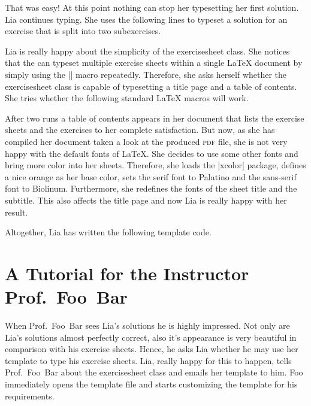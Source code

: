 \documentclass[a4paper,fleqn,9pt]{report}
\def\exercisesheet{{exercisesheet}}
\begin{document}
That was easy! At this point nothing can stop her typesetting her
first solution. Lia continues typing. She uses the following lines to
typeset a solution for an exercise that is split into two
subexercises.



Lia is really happy about the simplicity of the \exercisesheet{}
class. She notices that the can typeset multiple exercise sheets
within a single \LaTeX{} document by simply using the
|\sheet| macro repeatedly. Therefore, she asks herself
whether the \exercisesheet{} class is capable of typesetting a
title page and a table of contents. She tries whether the following
standard \LaTeX{} macros will work.



After two runs a table of contents appears in her document that lists
the exercise sheets and the exercises to her complete satisfaction.
But now, as she has compiled her document taken a look at the produced
\textsc{pdf} file, she is not very happy with the default fonts of
\LaTeX{}. She decides to use some other fonts and bring more color
into her sheets. Therefore, she loads the |xcolor| package,
defines a nice orange as her base color, sets the serif font to
Palatino and the sans-serif font to Biolinum. Furthermore, she
redefines the fonts of the sheet title and the subtitle. This also
affects the title page and now Lia is really happy with her result.


Altogether, Lia has written the following template code.




\section{A Tutorial for the Instructor Prof.~Foo~Bar}

When Prof.~Foo~Bar sees Lia's solutions he is highly impressed. Not
only are Lia's solutions almost perfectly correct, also it's
appearance is very beautiful in comparison with his exercise sheets.
Hence, he asks Lia whether he may use her template to type his
exercise sheets. Lia, really happy for this to happen, tells
Prof.~Foo~Bar about the \exercisesheet{} class and emails her template
to him. Foo immediately opens the template file and starts customizing
the template for his requirements.
\end{document}
